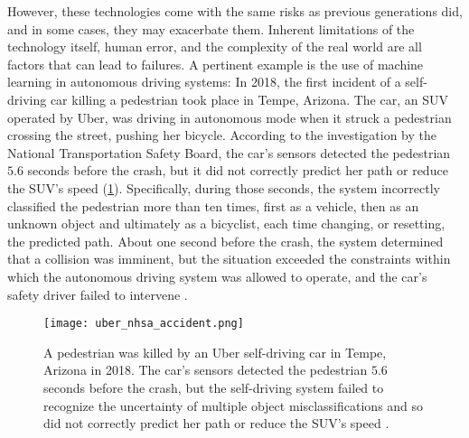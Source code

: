 However, these technologies come with the same risks as previous generations did, and in some cases, they may exacerbate them. Inherent limitations of the technology itself, human error, and the complexity of the real world are all factors that can lead to failures. A pertinent example is the use of machine learning in autonomous driving systems: 
In 2018, the first incident of a self-driving car killing a pedestrian took place in Tempe, Arizona. 
The car, an SUV operated by Uber, was driving in autonomous mode when it struck a pedestrian crossing the street, pushing her bicycle. 
According to the investigation by the National Transportation Safety Board, the car's sensors detected the pedestrian $5.6$ seconds before the crash, but it did not correctly predict her path or reduce the SUV's speed (\cref{fig:uber_nhsa_accident}). 
Specifically, during those seconds, the system incorrectly classified the pedestrian more than ten times, first as a vehicle, then as an unknown object and ultimately as a bicyclist, each time changing, or resetting, the predicted path. 
About one second before the crash, the system determined that a collision was imminent, but the situation exceeded the constraints within which the autonomous driving system was allowed to operate, and the car's safety driver failed to intervene \cite{nationaltransportationsafetyboardnhsa_collision_2019}. 

\begin{figure}[t]
    \centering
    \texttt{[image: uber\_nhsa\_accident.png]}
    \caption{A pedestrian was killed by an Uber self-driving car in Tempe, Arizona in 2018. The car's sensors detected the pedestrian $5.6$ seconds before the crash, but the self-driving system failed to recognize the uncertainty of multiple object misclassifications and so did not correctly predict her path or reduce the SUV's speed \cite{nationaltransportationsafetyboardnhsa_collision_2019}.}
    \label{fig:uber_nhsa_accident}
\end{figure}

